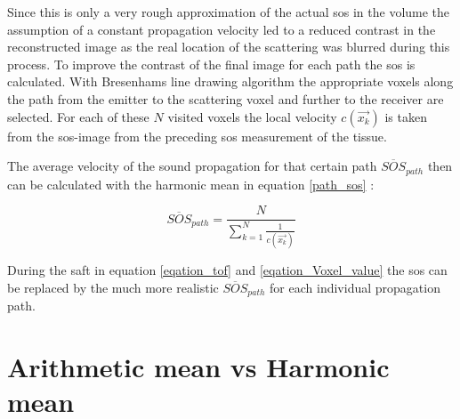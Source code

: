 Since this is only a very rough approximation of the actual \ac{sos} in the volume the assumption of a constant propagation velocity led to a reduced contrast in the reconstructed image as the real location of the scattering was blurred during this process.
To improve the contrast of the final image for each path the \ac{sos} is calculated. With Bresenhams line drawing algorithm \cite{Bresenham2010AlgorithmPlotter} the appropriate voxels along the path from the emitter to the scattering voxel and further to the receiver are selected. For each of these $N$ visited voxels the local velocity $c(\overrightarrow {x_k})$ is taken from the \ac{sos}-image from the preceding \ac{sos} measurement of the tissue.

The average velocity of the sound propagation for that certain path $\overline{SOS}_{path}$ then can be calculated with the harmonic mean in equation \ref{path_sos} \cite{Kretzek2014GPUAberration}:

\begin{equation}
 \overline{SOS}_{path} = \frac{N}{\sum_{k=1}^{N}  \frac{1}{c(\overrightarrow {x_k})} } 
\label{path_sos}
\end{equation}

During the \ac{saft} in equation \ref{eqation_tof} and \ref{eqation_Voxel_value} the \ac{sos} can be replaced by the much more realistic $\overline{SOS}_{path}$ for each individual propagation path.








\section{Arithmetic mean vs Harmonic mean}




